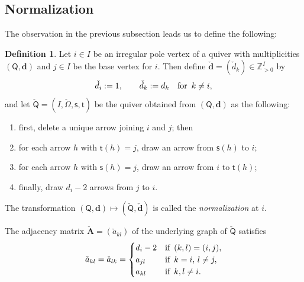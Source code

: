 \documentclass[pdftex]{sigma}
\newenvironment{enm}%
{\begin{enumerate}
\setlength{\itemsep}{0em}
}%
{\end{enumerate}}
\numberwithin{equation}{section}
\theoremstyle{definition}
\newtheorem{Definition}[Theorem]{Definition}
\newcommand{\Z}{\mathbb{Z}} %
\newcommand{\bA}{\mathbf{A}} %
\newcommand{\ved}{\mathbf{d}}
\newcommand{\hquad}{\hspace{.5em}}
\newcommand{\vin}{\mathsf{t}} %
\newcommand{\vout}{\mathsf{s}} %
\newcommand{\QQ}{\mathsf{Q}} %
\begin{document}
\subsection{Normalization}\label{subsec:normalization}

The observation in the previous subsection leads us to def\/ine the following:
\begin{Definition}\label{dfn:normalization}
Let $i \in I$ be an irregular pole vertex
of a quiver with multiplicities $(\QQ,\ved)$
and $j \in I$ be the base vertex for $i$.
Then def\/ine $\check{\ved}=(\check{d}_k) \in \Z_{>0}^I$ by
\[
\check{d}_i := 1, \qquad \check{d}_k := d_k \quad \text{for}\hquad k \neq i,
\]
and let $\check{\QQ}=(I,\check{\Omega},\vout,\vin)$
be the quiver obtained from $(\QQ,\ved)$ as the following:
\begin{enm}
\item f\/irst, delete a unique arrow joining $i$ and $j$; then
\item for each arrow $h$ with $\vin(h)=j$,
draw an arrow from $\vout(h)$ to $i$;
\item for each arrow $h$ with $\vout(h)=j$,
draw an arrow from $i$ to $\vin(h)$;
\item f\/inally, draw $d_i-2$ arrows from $j$ to $i$.
\end{enm}
The transformation $(\QQ,\ved) \mapsto (\check{\QQ},\check{\ved})$
is called the {\em normalization} at $i$.
\end{Definition}

The adjacency matrix $\check{\bA}=(\check{a}_{kl})$
of the underlying graph of $\check{\QQ}$ satisf\/ies
\[
\check{a}_{kl} = \check{a}_{lk} =
\begin{cases}
d_i -2 & \text{if}\hquad (k,l)=(i,j), \\
a_{jl} & \text{if}\hquad k=i,\,l \neq j, \\
a_{kl} & \text{if}\hquad k,l \neq i.
\end{cases}
\]
\end{document}
